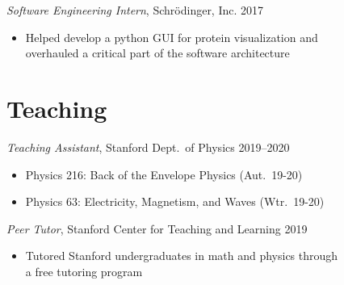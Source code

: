 \documentclass[margin,11pt]{res}
\newenvironment{myitemize}
{ \vspace{-1.5\topsep} \begin{itemize} \setlength\itemsep{0em}}
{ \end{itemize} \vspace{-1.0\topsep}}
\begin{document}
\begin{resume}
\textit{Software Engineering Intern}, Schr{\"o}dinger, Inc. \hfill 2017 \\
\begin{myitemize}
    \item Helped develop a python GUI for protein visualization and \\overhauled a critical part of the software architecture
\end{myitemize}

\section{Teaching}

\textit{Teaching Assistant}, Stanford Dept.\ of Physics \hfill 2019--2020\\
\begin{myitemize}
    \item Physics 216: Back of the Envelope Physics (Aut.\ 19-20)
    \item Physics 63: Electricity, Magnetism, and Waves (Wtr.\ 19-20)
\end{myitemize}

\textit{Peer Tutor}, Stanford Center for Teaching and Learning \hfill 2019\\
\begin{myitemize}
    \item Tutored Stanford undergraduates in math and physics through\\
        a free tutoring program
\end{myitemize}





\end{resume}
\end{document}
